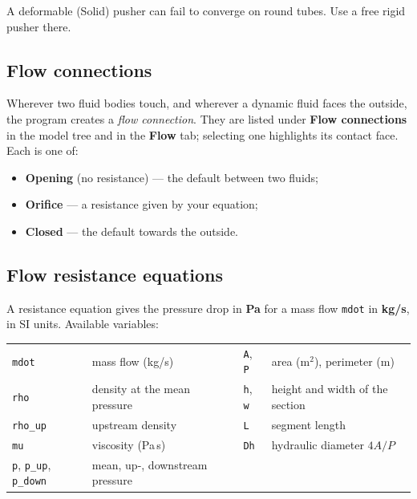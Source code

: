 \documentclass[11pt,a4paper]{article}
\newcommand{\code}[1]{\texttt{#1}}
\newcommand{\menu}[1]{\textsf{\textbf{#1}}}
\begin{document}
\begin{warn}
A deformable (Solid) pusher can fail to converge on round tubes. Use a free rigid pusher there.
\end{warn}

\subsection{Flow connections}

Wherever two fluid bodies touch, and wherever a dynamic fluid faces the outside, the program creates a \emph{flow
connection}. They are listed under \menu{Flow connections} in the model tree and in the \menu{Flow} tab; selecting
one highlights its contact face. Each is one of:
\begin{itemize}
\item \textbf{Opening} (no resistance) — the default between two fluids;
\item \textbf{Orifice} — a resistance given by your equation;
\item \textbf{Closed} — the default towards the outside.
\end{itemize}

\subsection{Flow resistance equations}
\label{sec:flowlaws}

A resistance equation gives the pressure drop in \textbf{Pa} for a mass flow \code{mdot} in \textbf{kg/s}, in SI
units. Available variables:

\begin{center}\small
\begin{tabular}{@{}ll@{\qquad}ll@{}}
\toprule
\code{mdot} & mass flow (kg/s) & \code{A}, \code{P} & area (m$^2$), perimeter (m) \\
\code{rho} & density at the mean pressure & \code{h}, \code{w} & height and width of the section \\
\code{rho\_up} & upstream density & \code{L} & segment length \\
\code{mu} & viscosity (Pa\,s) & \code{Dh} & hydraulic diameter $4A/P$ \\
\code{p}, \code{p\_up}, \code{p\_down} & mean, up-, downstream pressure & & \\
\bottomrule
\end{tabular}
\end{center}
\end{document}

